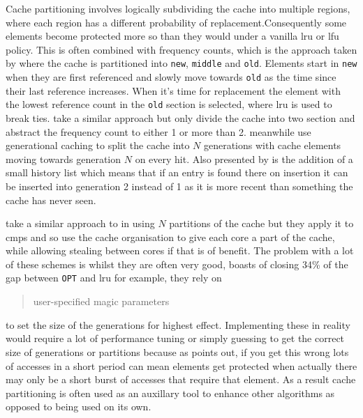 Cache partitioning involves logically subdividing the cache into multiple regions, where each region has a different probability of replacement.Consequently some elements become protected more so than they would under a vanilla \gls{lru} or \gls{lfu} policy. This is often combined with frequency counts, which is the approach taken by \citet{robinsonDataCacheManagement1990} where the cache is partitioned into \texttt{new}, \texttt{middle} and \texttt{old}. Elements start in \texttt{new} when they are first referenced and slowly move towards \texttt{old} as the time since their last reference increases. When it's time for replacement the element with the lowest reference count in the \texttt{old} section is selected, where \gls{lru} is used to break ties. \citet{karedlaCachingStrategiesImprove1994} take a similar approach but only divide the cache into two section and abstract the frequency count to either 1 or more than 2. \citet{osawaGenerationalReplacementSchemes1997} meanwhile use generational caching to split the cache into $N$ generations with cache elements moving towards generation $N$ on every hit. Also presented by \citeauthor{osawaGenerationalReplacementSchemes1997} is the addition of a small history list which means that if an entry is found there on insertion it can be inserted into generation 2 instead of 1 as it is more recent than something the cache has never seen. 

\citet{juanImprovedMulticoreShared2012} take a similar approach to \citeauthor{osawaGenerationalReplacementSchemes1997} in using $N$ partitions of the cache but they apply it to \gls{cmp}s and so use the cache organisation to give each core a part of the cache, while allowing stealing between cores if that is of benefit. The problem with a lot of these schemes is whilst they are often very good, \citet{robinsonDataCacheManagement1990} boasts of closing 34\% of the gap between \texttt{OPT} and \gls{lru} for example, they rely on  \blockcquote{bansalCARClockAdaptive2004}{user-specified magic parameters} to set the size of the generations for highest effect. Implementing these in reality would require a lot of performance tuning or simply guessing to get the correct size of generations or partitions because as \citeauthor{osawaGenerationalReplacementSchemes1997} points out, if you get this wrong lots of accesses in a short period can mean elements get protected when actually there may only be a short burst of accesses that require that element. As a result cache partitioning is often used as an auxillary tool to enhance other algorithms as opposed to being used on its own.

